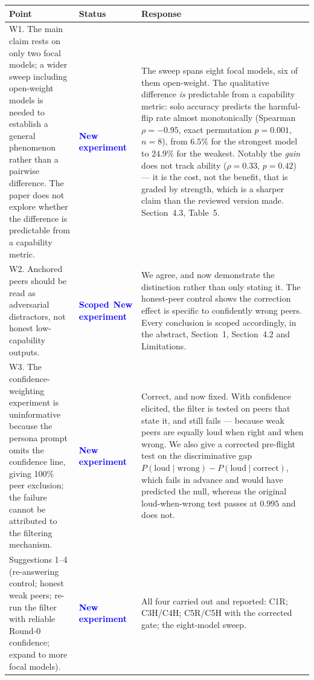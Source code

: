 \documentclass[11pt]{article}
\newcommand{\newexp}{\textcolor{blue}{\textbf{New experiment}}}
\newcommand{\scoped}{\textcolor{blue}{\textbf{Scoped}}}
\begin{document}
\begin{longtable}{@{}p{}p{}p{}@{}}
\toprule
\textbf{Point} & \textbf{Status} & \textbf{Response} \\
\midrule
\endhead
W1. The main claim rests on only two focal models; a wider sweep including
open-weight models is needed to establish a general phenomenon rather than a
pairwise difference. The paper does not explore whether the difference is
predictable from a capability metric.
& \newexp
& The sweep spans eight focal models, six of them open-weight. The qualitative
  difference \emph{is} predictable from a capability metric: solo accuracy
  predicts the harmful-flip rate almost monotonically
  (Spearman $\rho=-0.95$, exact permutation $p=0.001$, $n=8$), from $6.5\%$ for the strongest
  model to $24.9\%$ for the weakest. Notably the \emph{gain} does not track
  ability ($\rho=0.33$, $p=0.42$) --- it is the cost, not the benefit, that is
  graded by strength, which is a sharper claim than the reviewed version made.
  Section~4.3, Table~5. \\
\addlinespace
W2. Anchored peers should be read as adversarial distractors, not honest
low-capability outputs.
& \scoped\ \newexp
& We agree, and now demonstrate the distinction rather than only stating it.
  The honest-peer control shows the correction effect is specific to
  confidently wrong peers. Every conclusion is scoped accordingly, in the
  abstract, Section~1, Section~4.2 and Limitations. \\
\addlinespace
W3. The confidence-weighting experiment is uninformative because the persona
prompt omits the confidence line, giving 100\% peer exclusion; the failure
cannot be attributed to the filtering mechanism.
& \newexp
& Correct, and now fixed. With confidence elicited, the filter is tested on
  peers that state it, and still fails --- because weak peers are equally loud
  when right and when wrong. We also give a corrected pre-flight test on the
  discriminative gap
  $P(\text{loud}\mid\text{wrong})-P(\text{loud}\mid\text{correct})$, which fails
  in advance and would have predicted the null, whereas the original
  loud-when-wrong test passes at $0.995$ and does not. \\
\addlinespace
Suggestions 1--4 (re-answering control; honest weak peers; re-run the filter
with reliable Round-0 confidence; expand to more focal models).
& \newexp
& All four carried out and reported: C1R; C3H/C4H; C5R/C5H with the corrected
  gate; the eight-model sweep. \\
\bottomrule
\end{longtable}
\end{document}

